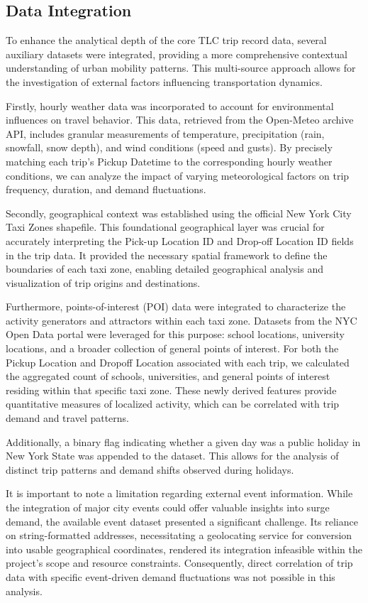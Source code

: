 \documentclass[conference]{IEEEtran}
\begin{document}
\subsection{Data Integration}

To enhance the analytical depth of the core TLC trip record data, several auxiliary datasets were integrated, providing
a more comprehensive contextual understanding of urban mobility patterns. This multi-source approach allows for the
investigation of external factors influencing transportation dynamics.

Firstly, hourly weather data was incorporated to account for environmental influences on travel behavior. This data,
retrieved from the Open-Meteo archive API, includes granular measurements of temperature, precipitation (rain, snowfall,
snow depth), and wind conditions (speed and gusts). By precisely matching each trip's Pickup Datetime to the
corresponding hourly weather conditions, we can analyze the impact of varying meteorological factors on trip frequency,
duration, and demand fluctuations.

Secondly, geographical context was established using the official New York City Taxi Zones shapefile. This foundational
geographical layer was crucial for accurately interpreting the Pick-up Location ID and Drop-off Location ID fields in
the trip data. It provided the necessary spatial framework to define the boundaries of each taxi zone, enabling detailed
geographical analysis and visualization of trip origins and destinations.

Furthermore, points-of-interest (POI) data were integrated to characterize the activity generators and attractors within
each taxi zone. Datasets from the NYC Open Data portal were leveraged for this purpose: school locations, university
locations, and a broader collection of general points of interest. For both the Pickup Location and Dropoff Location
associated with each trip, we calculated the aggregated count of schools, universities, and general points of interest
residing within that specific taxi zone. These newly derived features provide quantitative measures of localized
activity, which can be correlated with trip demand and travel patterns.

Additionally, a binary flag indicating whether a given day was a public holiday in New York State was appended to the
dataset. This allows for the analysis of distinct trip patterns and demand shifts observed during holidays.

It is important to note a limitation regarding external event information. While the integration of major city events
could offer valuable insights into surge demand, the available event dataset presented a significant challenge. Its
reliance on string-formatted addresses, necessitating a geolocating service for conversion into usable geographical
coordinates, rendered its integration infeasible within the project's scope and resource constraints. Consequently,
direct correlation of trip data with specific event-driven demand fluctuations was not possible in this analysis.
\end{document}
